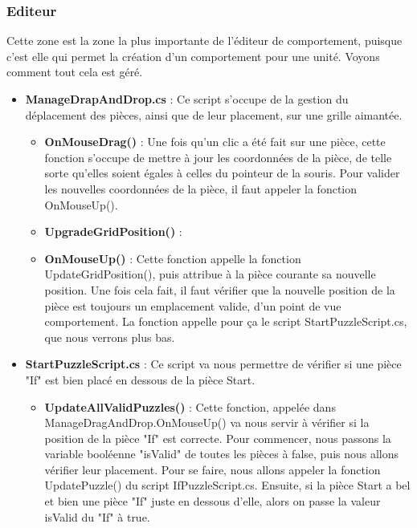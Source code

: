 \documentclass{article}
\begin{document}
\subsubsection{Editeur}
Cette zone est la zone la plus importante de l'éditeur de comportement, puisque c'est elle qui permet la création d'un comportement pour une unité. 
Voyons comment tout cela est géré.
\begin{itemize}
\item\textbf{ManageDrapAndDrop.cs} : Ce script s'occupe de la gestion du déplacement des pièces, ainsi que de leur placement, sur une grille aimantée.
\begin{itemize}
\item\textbf{OnMouseDrag()} : Une fois qu'un clic a été fait sur une pièce, cette fonction s'occupe de mettre à jour les coordonnées de la pièce, de telle sorte qu'elles soient égales à celles du pointeur de la souris. Pour valider les nouvelles coordonnées de la pièce, il faut appeler la fonction OnMouseUp().
\end{itemize}
\begin{itemize}
\item\textbf{UpgradeGridPosition()} : 
\end{itemize}
\begin{itemize}
\item\textbf{OnMouseUp()} : Cette fonction appelle la fonction UpdateGridPosition(), puis attribue à la pièce courante sa nouvelle position. Une fois cela fait, il faut vérifier que la nouvelle position de la pièce est toujours un emplacement valide, d'un point de vue comportement. La fonction appelle pour ça le script StartPuzzleScript.cs, que nous verrons plus bas.
\end{itemize}
\item\textbf{StartPuzzleScript.cs} : Ce script va nous permettre de vérifier si une pièce "If" est bien placé en dessous de la pièce Start.

\begin{itemize}
\item\textbf{UpdateAllValidPuzzles()} : Cette fonction, appelée dans ManageDragAndDrop.OnMouseUp() va nous servir à vérifier si la position de la pièce "If" est correcte. Pour commencer, nous passons la variable booléenne "isValid" de toutes les pièces à false, puis nous allons vérifier leur placement.\newline
Pour se faire, nous allons appeler la fonction UpdatePuzzle() du script IfPuzzleScript.cs.\newline
Ensuite, si la pièce Start a bel et bien une pièce "If" juste en dessous d'elle, alors on passe la valeur isValid du "If" à true.
\end{itemize}


\end{itemize}
\end{document}
